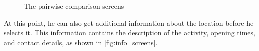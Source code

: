 \documentclass[11pt,a4paper,oneside]{article}
\begin{document}
\begin{figure}[H]
    \centering
    \qquad
    \caption{The pairwise comparison screens }%
    \label{fig:pairwise_comparison_screens}%
\end{figure}

At this point, he can also get additional information about the location before he selects it. This information contains the description of the activity, opening times, and contact details, as shown in \autoref{fig:info_screens}.
\end{document}
